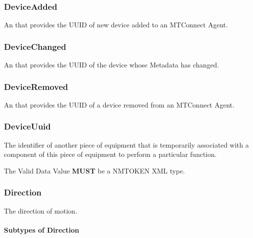 \subsubsection{DeviceAdded}
\label{sec:DeviceAdded}



An  that provides the \gls{UUID} of new device added to an \gls{MTConnect Agent}.


\subsubsection{DeviceChanged}
\label{sec:DeviceChanged}



An  that provides the \gls{UUID} of the device whose \gls{Metadata} has changed.


\subsubsection{DeviceRemoved}
\label{sec:DeviceRemoved}



An  that provides the \gls{UUID} of a device removed from an \gls{MTConnect Agent}.


\subsubsection{DeviceUuid}
\label{sec:DeviceUuid}



The identifier of another piece of equipment that is temporarily associated with a component of this piece of equipment to perform a particular function.
  
 The \gls{Valid Data Value} \textbf{MUST} be a NMTOKEN XML type.


\subsubsection{Direction}




The direction of motion.


\paragraph{Subtypes of Direction}\mbox{}
\label{sec:Subtypes of Direction}

